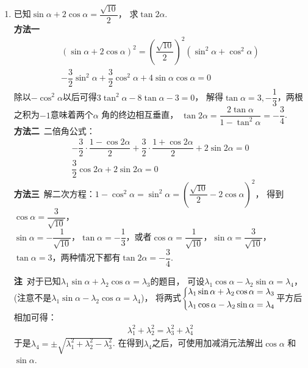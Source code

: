 \begin{enumerate}[label={【\textbf{例\thechapter.\arabic*}】},
 leftmargin=\inteval{\myenumleftmargin}pt,
 itemsep=\inteval{\myenumitempsep}pt,
 itemindent=\inteval{\myenumitemindent}pt]
\item \label{求tan2a例题}已知$ \sin\alpha+2\cos\alpha=\dfrac{\sqrt{10}}{2} $，
求$ \tan2\alpha $. \\
\textbf{方法一}\ 
\begin{gather*}
    (\sin\alpha+2\cos\alpha)^2=\left(\dfrac{\sqrt{10}}{2} \right)^2(\sin^2\alpha+\cos^2\alpha)  \\
    -\dfrac{3}{2}\sin^2\alpha+\dfrac{3}{2}\cos^2\alpha+4\sin\alpha \cos\alpha=0  
\end{gather*}
除以$ -\cos^2\alpha $以后可得$ 3\tan^2\alpha-8\tan\alpha-3=0 $，
解得$ \tan\alpha=3,-\dfrac{1}{3} $，两根之积为$ -1 $意味着两个$ \alpha $ 
角的终边相互垂直， $\tan2\alpha=\dfrac{2\tan \alpha}{1-\tan^2\alpha}=-\dfrac{3}{4} $. \\
\textbf{方法二}\ 二倍角公式：
\begin{gather*}
    -\dfrac{3}{2}\cdot\dfrac{1-\cos2\alpha}{2}+\dfrac{3}{2}\cdot\dfrac{1+\cos2\alpha}{2}
    +2\sin2\alpha=0  \\
    \dfrac{3}{2}\cos2\alpha+2\sin2\alpha=0 
\end{gather*}
\textbf{方法三}\ 解二次方程：$ 1-\cos^2\alpha=\sin^2\alpha=
\left(\dfrac{\sqrt{10}}{2}-2\cos\alpha \right)^2 $，
得到$ \cos\alpha=\dfrac{3}{\sqrt{10}} $，\\
$ \sin\alpha=-\dfrac{1}{\sqrt{10}} $，$\tan\alpha=-\dfrac{1}{3} $，或者$ \cos\alpha=\dfrac{1}{\sqrt{10}}$，$\sin\alpha=\dfrac{3}{\sqrt{10}}$， $\tan\alpha=3 $，两种情况下都有$ \tan2\alpha=-\dfrac{3}{4} $. 

\textbf{注}\ 对于已知$ \lambda_1\sin\alpha+\lambda_2\cos\alpha=\lambda_3 $的题目，
可设$ \lambda_1\cos\alpha-\lambda_2\sin\alpha=\lambda_4 $，
(注意不是$ \lambda_1\sin\alpha-\lambda_2\cos\alpha=\lambda_4 $)，
将两式$ \begin{dcases}
    \lambda_1\sin\alpha+\lambda_2\cos\alpha=\lambda_3 \\
    \lambda_1\cos\alpha-\lambda_2\sin\alpha=\lambda_4
\end{dcases} $平方后相加可得：
\begin{gather*}
    \lambda_1^2+\lambda_2^2=\lambda_3^2+\lambda_4^2 
\end{gather*}
于是$ \lambda_4=\pm \sqrt{\lambda_1^2+\lambda_2^2-\lambda_3^2} $. 
在得到$ \lambda_4 $之后，可使用加减消元法解出$ \cos\alpha$ 和 $\sin\alpha $. 


\end{enumerate}
